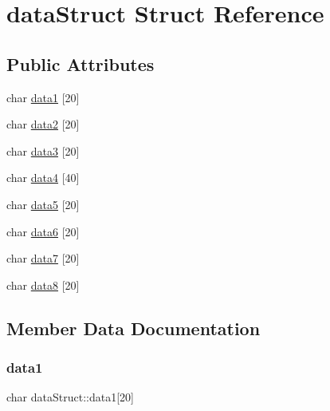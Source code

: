 \hypertarget{structdata_struct}{}\section{data\+Struct Struct Reference}
\label{structdata_struct}
\subsection*{Public Attributes}
\begin{DoxyCompactItemize}
\item 
char \mbox{\hyperlink{structdata_struct_a4bf91f53a0b76467044d355f00c90980}{data1}} \mbox{[}20\mbox{]}
\item 
char \mbox{\hyperlink{structdata_struct_ac2e5c2fbea75926c95179eef74fadc66}{data2}} \mbox{[}20\mbox{]}
\item 
char \mbox{\hyperlink{structdata_struct_a1e9b0674381e0081e5e28159aebaa2a1}{data3}} \mbox{[}20\mbox{]}
\item 
char \mbox{\hyperlink{structdata_struct_a0df812fb9039686abb9406cc98c0d02f}{data4}} \mbox{[}40\mbox{]}
\item 
char \mbox{\hyperlink{structdata_struct_a4c91ed9bd87bc026046513ac1a81fad4}{data5}} \mbox{[}20\mbox{]}
\item 
char \mbox{\hyperlink{structdata_struct_a211c71868cb220581684257d91f73f45}{data6}} \mbox{[}20\mbox{]}
\item 
char \mbox{\hyperlink{structdata_struct_ac6047dd89e94b7b6e9de7d17d5e3de52}{data7}} \mbox{[}20\mbox{]}
\item 
char \mbox{\hyperlink{structdata_struct_a2b4485af961a086fb7d678e4d665c5a2}{data8}} \mbox{[}20\mbox{]}
\end{DoxyCompactItemize}


\subsection{Member Data Documentation}
\mbox{\label{structdata_struct_a4bf91f53a0b76467044d355f00c90980}} 
\subsubsection{\texorpdfstring{data1}{data1}}
{\footnotesize\ttfamily char data\+Struct\+::data1\mbox{[}20\mbox{]}}

